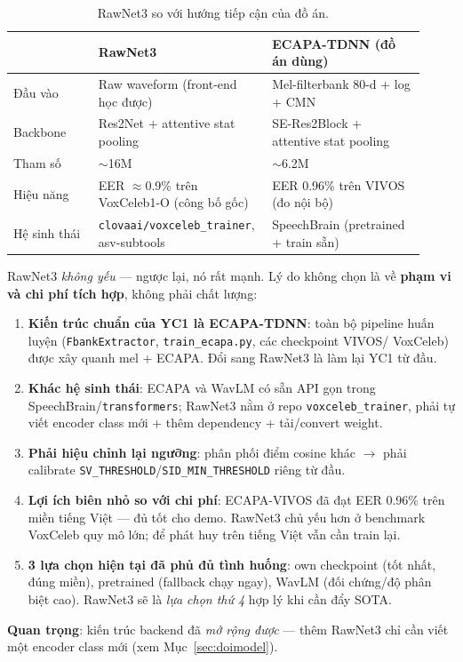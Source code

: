 \documentclass[12pt,a4paper]{article}
\begin{document}
\begin{table}[H]
\centering\small
\caption{RawNet3 so với hướng tiếp cận của đồ án.}
\begin{tabular}{p{0.20\linewidth}p{0.36\linewidth}p{0.36\linewidth}}
\toprule
& \textbf{RawNet3} & \textbf{ECAPA-TDNN} (đồ án dùng) \\
\midrule
Đầu vào & Raw waveform (front-end học được) & Mel-filterbank 80-d + log + CMN \\
Backbone & Res2Net + attentive stat pooling & SE-Res2Block + attentive stat pooling \\
Tham số & $\sim$16M & $\sim$6.2M \\
Hiệu năng & EER $\approx$0.9\% trên VoxCeleb1-O (công bố gốc) & EER 0.96\% trên VIVOS (đo nội bộ) \\
Hệ sinh thái & \texttt{clovaai/voxceleb\_trainer}, asv-subtools & SpeechBrain (pretrained + train sẵn) \\
\bottomrule
\end{tabular}
\end{table}

\begin{luuybox}
RawNet3 \emph{không yếu} --- ngược lại, nó rất mạnh. Lý do không chọn là về
\textbf{phạm vi và chi phí tích hợp}, không phải chất lượng:
\begin{enumerate}
  \item \textbf{Kiến trúc chuẩn của YC1 là ECAPA-TDNN}: toàn bộ pipeline huấn
  luyện (\texttt{FbankExtractor}, \texttt{train\_ecapa.py}, các checkpoint VIVOS/
  VoxCeleb) được xây quanh mel + ECAPA. Đổi sang RawNet3 là làm lại YC1 từ đầu.
  \item \textbf{Khác hệ sinh thái}: ECAPA và WavLM có sẵn API gọn trong
  SpeechBrain/\texttt{transformers}; RawNet3 nằm ở repo \texttt{voxceleb\_trainer},
  phải tự viết encoder class mới + thêm dependency + tải/convert weight.
  \item \textbf{Phải hiệu chỉnh lại ngưỡng}: phân phối điểm cosine khác $\to$ phải
  calibrate \texttt{SV\_THRESHOLD}/\texttt{SID\_MIN\_THRESHOLD} riêng từ đầu.
  \item \textbf{Lợi ích biên nhỏ so với chi phí}: ECAPA-VIVOS đã đạt EER 0.96\%
  trên miền tiếng Việt --- đủ tốt cho demo. RawNet3 chủ yếu hơn ở benchmark
  VoxCeleb quy mô lớn; để phát huy trên tiếng Việt vẫn cần train lại.
  \item \textbf{3 lựa chọn hiện tại đã phủ đủ tình huống}: own checkpoint (tốt
  nhất, đúng miền), pretrained (fallback chạy ngay), WavLM (đối chứng/độ phân biệt
  cao). RawNet3 sẽ là \emph{lựa chọn thứ 4} hợp lý khi cần đẩy SOTA.
\end{enumerate}
\textbf{Quan trọng}: kiến trúc backend đã \emph{mở rộng được} --- thêm RawNet3 chỉ
cần viết một encoder class mới (xem Mục~\ref{sec:doimodel}).
\end{luuybox}
\end{document}
